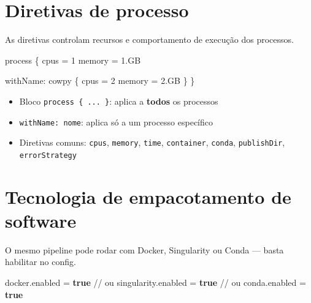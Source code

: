 \documentclass[
  brazilian,
  letterpaper,
  DIV=11,
  numbers=noendperiod]{scrreprt}
\newenvironment{Shaded}{\begin{snugshade}}{\end{snugshade}}
\newcommand{\CommentTok}[1]{\textcolor[rgb]{0.37,0.37,0.37}{#1}}
\newcommand{\DecValTok}[1]{\textcolor[rgb]{0.68,0.00,0.00}{#1}}
\newcommand{\FloatTok}[1]{\textcolor[rgb]{0.68,0.00,0.00}{#1}}
\newcommand{\KeywordTok}[1]{\textcolor[rgb]{0.00,0.23,0.31}{\textbf{#1}}}
\newcommand{\NormalTok}[1]{\textcolor[rgb]{0.00,0.23,0.31}{#1}}
\newcommand{\OperatorTok}[1]{\textcolor[rgb]{0.37,0.37,0.37}{#1}}
\newcommand{\StringTok}[1]{\textcolor[rgb]{0.13,0.47,0.30}{#1}}
\providecommand{\tightlist}{%
  \setlength{\itemsep}{0pt}\setlength{\parskip}{0pt}}
\begin{document}
\section{Diretivas de processo}\label{diretivas-de-processo}

As diretivas controlam recursos e comportamento de execução dos
processos.

\begin{Shaded}
\begin{Highlighting}[]
\NormalTok{process }\OperatorTok{\{}
\NormalTok{    cpus   }\OperatorTok{=} \DecValTok{1}
\NormalTok{    memory }\OperatorTok{=} \FloatTok{1.}\NormalTok{GB}

\NormalTok{    withName}\OperatorTok{:} \StringTok{\textquotesingle{}cowpy\textquotesingle{}} \OperatorTok{\{}
\NormalTok{        cpus   }\OperatorTok{=} \DecValTok{2}
\NormalTok{        memory }\OperatorTok{=} \FloatTok{2.}\NormalTok{GB}
    \OperatorTok{\}}
\OperatorTok{\}}
\end{Highlighting}
\end{Shaded}

\begin{itemize}
\tightlist
\item
  Bloco \texttt{process\ \{\ ...\ \}}: aplica a \textbf{todos} os
  processos
\item
  \texttt{withName:\ \textquotesingle{}nome\textquotesingle{}}: aplica
  só a um processo específico
\item
  Diretivas comuns: \texttt{cpus}, \texttt{memory}, \texttt{time},
  \texttt{container}, \texttt{conda}, \texttt{publishDir},
  \texttt{errorStrategy}
\end{itemize}

\section{Tecnologia de empacotamento de
software}\label{tecnologia-de-empacotamento-de-software}

O mesmo pipeline pode rodar com Docker, Singularity ou Conda --- basta
habilitar no config.

\begin{Shaded}
\begin{Highlighting}[]
\NormalTok{docker}\OperatorTok{.}\NormalTok{enabled      }\OperatorTok{=} \KeywordTok{true}
\CommentTok{// ou}
\NormalTok{singularity}\OperatorTok{.}\NormalTok{enabled }\OperatorTok{=} \KeywordTok{true}
\CommentTok{// ou}
\NormalTok{conda}\OperatorTok{.}\NormalTok{enabled       }\OperatorTok{=} \KeywordTok{true}
\end{Highlighting}
\end{Shaded}
\end{document}
